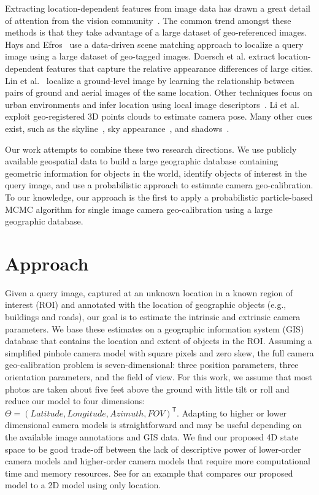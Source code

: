 Extracting location-dependent features from image data has drawn a
great detail of attention from the vision
community~\cite{jacobs07geolocate, jacobs11geolocate,
jacobs08geoorient}. The common trend amongst these methods is that
they take advantage of a large dataset of geo-referenced images. Hays
and Efros~\cite{im2gps} use a data-driven scene matching
approach to localize a query image using a large dataset of geo-tagged
images.  Doersch et al. extract location-dependent features that
capture the relative appearance differences of large cities.  Lin et
al.~\cite{lin2013cross} localize a ground-level image by learning the
relationship between pairs of ground and aerial images of the same
location. Other techniques focus on urban environments and infer
location using local image
descriptors~\cite{schindler2008detecting,snavely2006photo}. Li et
al.~\cite{li2012worldwide} exploit geo-registered 3D points clouds to
estimate camera pose. Many other cues exist, such as the
skyline~\cite{baatz2012large,ramalingam2009geolocalization}, sky
appearance~\cite{lalonde2010sun,workman2014rainbow}, and
shadows~\cite{junejo2008estimating,wu2010geo}.

Our work attempts to combine these two research directions. We use
publicly available geospatial data to build a large geographic
database containing geometric information for objects in the world,
identify objects of interest in the query image, and use a
probabilistic approach to estimate camera geo-calibration. To our
knowledge, our approach is the first to apply a probabilistic
particle-based MCMC algorithm for single image camera geo-calibration
using a large geographic database. 


\section{Approach}

Given a query image, captured at an unknown location in a known region
of interest (ROI) and annotated with the location of geographic objects
(e.g., buildings and roads), our goal is to estimate the intrinsic and
extrinsic camera parameters.  We base these estimates on a geographic
information system (GIS) database that contains the location and
extent of objects in the ROI.  Assuming a simplified
pinhole camera model
with square pixels and zero skew, the full camera geo-calibration
problem is seven-dimensional: three position parameters, three
orientation parameters, and the field of view. For this work, we
assume that most photos are taken about five feet above the ground
with little tilt or roll and reduce our model to four dimensions:
$\Theta = (Latitude, Longitude, Azimuth, FOV)^\mathsf{T}$. 
%
Adapting to higher or lower dimensional camera models is
straightforward and may be useful depending on the available image
annotations and GIS data.  We find our proposed 4D state space to be
good trade-off between the lack of descriptive power of lower-order
camera models and higher-order camera models that require more
computational time and memory resources. See  for an
example that compares our proposed model to a 2D model using only
location.

